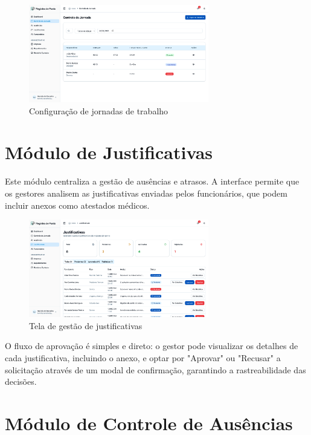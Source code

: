 \begin{figure}[H]
\centering
\includegraphics[width=0.7\textwidth]{imagens/configuracao-jornada.png}
\caption{Configuração de jornadas de trabalho}
\label{fig:configuracao-jornada}
\end{figure}

\section{Módulo de Justificativas}

Este módulo centraliza a gestão de ausências e atrasos. A interface permite que os gestores analisem as justificativas enviadas pelos funcionários, que podem incluir anexos como atestados médicos.

\begin{figure}[H]
\centering
\includegraphics[width=0.7\textwidth]{imagens/gestao-justificativas.png}
\caption{Tela de gestão de justificativas}
\label{fig:gestao-justificativas}
\end{figure}

O fluxo de aprovação é simples e direto: o gestor pode visualizar os detalhes de cada justificativa, incluindo o anexo, e optar por "Aprovar" ou "Recusar" a solicitação através de um modal de confirmação, garantindo a rastreabilidade das decisões.

\section{Módulo de Controle de Ausências}

